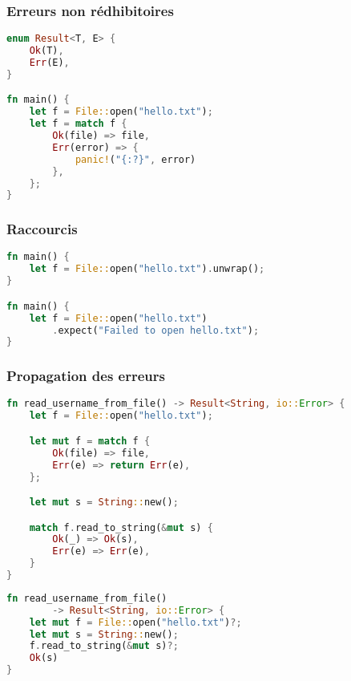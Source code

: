 \begin{frame}[fragile]
  \frametitle{Erreurs non rédhibitoires}
  \begin{lstlisting}[language=rust, basicstyle=\small{}]
enum Result<T, E> {
    Ok(T),
    Err(E),
}

fn main() {
    let f = File::open("hello.txt");
    let f = match f {
        Ok(file) => file,
        Err(error) => {
            panic!("{:?}", error)
        },
    };
}
  \end{lstlisting}
\end{frame}

\begin{frame}[fragile]
  \frametitle{Raccourcis}
  \begin{lstlisting}[language=rust]
fn main() {
    let f = File::open("hello.txt").unwrap();
}

fn main() {
    let f = File::open("hello.txt")
        .expect("Failed to open hello.txt");
}
  \end{lstlisting}
\end{frame}

\begin{frame}[fragile]
  \frametitle{Propagation des erreurs}
  \begin{lstlisting}[language=rust, basicstyle=\small{}]
fn read_username_from_file() -> Result<String, io::Error> {
    let f = File::open("hello.txt");

    let mut f = match f {
        Ok(file) => file,
        Err(e) => return Err(e),
    };

    let mut s = String::new();

    match f.read_to_string(&mut s) {
        Ok(_) => Ok(s),
        Err(e) => Err(e),
    }
}
  \end{lstlisting}
\end{frame}

\begin{frame}[fragile]
  \begin{lstlisting}[language=rust]
fn read_username_from_file()
        -> Result<String, io::Error> {
    let mut f = File::open("hello.txt")?;
    let mut s = String::new();
    f.read_to_string(&mut s)?;
    Ok(s)
}
  \end{lstlisting}
\end{frame}
